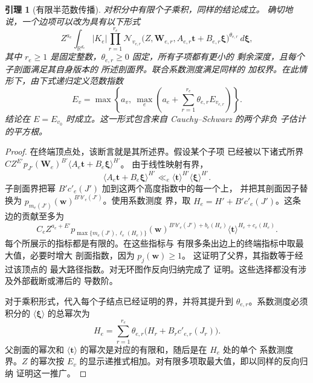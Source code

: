 \documentclass[11pt,a4paper]{article}
\numberwithin{equation}{section}
\numberwithin{figure}{section}
\newtheorem{lemma}[theorem]{引理}
\theoremstyle{definition}
\theoremstyle{remark}
\begin{document}
\begin{lemma}[有限半范数传播]
对积分中有限个子乘积，同样的结论成立。
确切地说，一个边项可以改为具有以下形式
\[
 Z^{a_e}\int_{\mathbb R^{d_e}}|K_e|
 \prod_{r=1}^{r_e}
 \mathcal N_{v_{e,r}}\bigl(Z,\boldsymbol W_{e,r},
       A_{e,r}\boldsymbol t+B_{e,r}\boldsymbol\xi\bigr)^{\theta_{e,r}}
 \,d\boldsymbol\xi,
\]
其中 $r_e\ge1$ 是固定整数，$\theta_{e,r}\ge0$ 固定，所有子项都有更小的
剩余深度，且每个子剖面满足其自身版本的
所述剖面界。联合系数测度满足同样的
加权界。在此情形下，由下式递归定义范数指数
\[
 E_v=\max\left\{a_v,\ \max_e
             \left(a_e+\sum_{r=1}^{r_e}\theta_{e,r}E_{v_{e,r}}\right)\right\}.
\]
结论在 $E=E_{v_0}$ 时成立。这一形式包含来自 Cauchy--Schwarz 的两个非负
子估计的平方根。
\end{lemma}

\begin{proof}
在终端顶点处，该断言就是其所述界。假设某个子项
已经被以下诸式所界
$C Z^{E'}p_{J'}(\boldsymbol W_e)^{B'}
 \langle A_e\boldsymbol t+B_e\boldsymbol\xi\rangle^{H'}$。
由于线性映射有界，
\[
 \langle A_e\boldsymbol t+B_e\boldsymbol\xi\rangle^{H'}
 \ll_e\langle\boldsymbol t\rangle^{H'}
              \langle\boldsymbol\xi\rangle^{H'}.
\]
子剖面界把幂 $B'c'_e(J')$ 加到这两个高度指数中的每一个上，
并把其剖面因子替换为
$p_{m_e(J')}(\boldsymbol w)^{B'b'_e(J')}$。使用系数测度
界，取
$H_e=H'+B'c'_e(J')$。这条边的贡献至多为
\[
 C_e Z^{a_e+E'}
 p_{\max\{m_e(J'),\ell_e(H_e)\}}(\boldsymbol w)^{B'b'_e(J')+b_e(H_e)}
 \langle\boldsymbol t\rangle^{H_e+c_e(H_e)}.
\]
每个所展示的指标都是有限的。在这些指标与
有限多条出边上的终端指标中取最大值，必要时增大
剖面指数，因为 $p_j(\boldsymbol w)\ge1$。
这证明了父界，其指数等于经过该顶点的
最大路径指数。对无环图作反向归纳完成了
证明。这些选择都没有涉及外部截断或滞后的
导数阶。

对于乘积形式，代入每个子结点已经证明的界，并将其提升到 $\theta_{e,r}$。系数测度必须积分的
$\langle\boldsymbol\xi\rangle$ 的总幂次为
\[
 H_e=\sum_{r=1}^{r_e}\theta_{e,r}
       \bigl(H_r+B_r c'_{e,r}(J_r)\bigr).
\]
父剖面的幂次和 $\langle\boldsymbol t\rangle$ 的幂次是对应的有限和，随后是在 $H_e$ 处的单个
系数测度界。$Z$ 的幂次按 $E_v$ 的显示递推式相加。对有限多项取最大值，即以同样的反向归纳
证明这一推广。
\end{proof}
\end{document}
